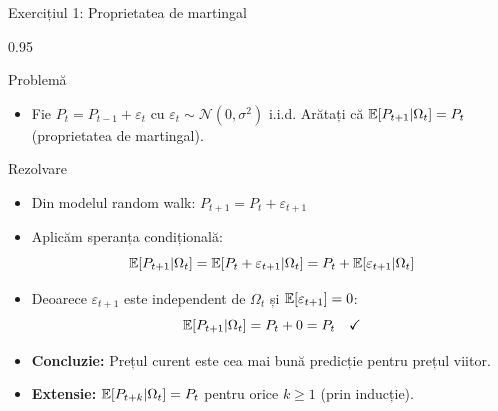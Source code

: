 \documentclass[9pt, aspectratio=169, t]{beamer}
\begin{document}
\begin{frame}[shrink=15]{Exercițiul 1: Proprietatea de martingal}
\begin{cminipage}{0.95\textwidth}
\begin{block}{Problemă}
\begin{itemize}\setlength{\itemsep}{0pt}
    \item Fie $P_t = P_{t-1} + \varepsilon_t$ cu $\varepsilon_t \sim \mathcal{N}(0, \sigma^2)$ i.i.d. Arătați că $\mathbb{E}[P_{t+1} | \Omega_t] = P_t$ (proprietatea de martingal).
\end{itemize}
\end{block}

\begin{exampleblock}{Rezolvare}
\begin{itemize}\setlength{\itemsep}{0pt}
    \item Din modelul random walk: $P_{t+1} = P_t + \varepsilon_{t+1}$
    \item Aplicăm speranța condițională:
$$\mathbb{E}[P_{t+1} | \Omega_t] = \mathbb{E}[P_t + \varepsilon_{t+1} | \Omega_t] = P_t + \mathbb{E}[\varepsilon_{t+1} | \Omega_t]$$
    \item Deoarece $\varepsilon_{t+1}$ este independent de $\Omega_t$ și $\mathbb{E}[\varepsilon_{t+1}] = 0$:
$$\mathbb{E}[P_{t+1} | \Omega_t] = P_t + 0 = P_t \quad \checkmark$$
    \item \textbf{Concluzie:} Prețul curent este cea mai bună predicție pentru prețul viitor.
    \item \textbf{Extensie:} $\mathbb{E}[P_{t+k} | \Omega_t] = P_t$ pentru orice $k \geq 1$ (prin inducție).
\end{itemize}
\end{exampleblock}
\end{cminipage}
\end{frame}
\end{document}
